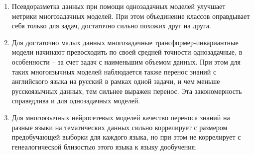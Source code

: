{}
\begin{enumerate}
  \item {Псевдоразметка данных при помощи однозадачных моделей улучшает метрики многозадачных моделей. При этом объединение классов оправдывает себя только для задач, достаточно сильно похожих друг на друга.}
  \item {Для достаточно малых данных многозадачные трансформер-инвариантные модели начинают превосходить по своей средней точности однозадачные, в особенности -- за счет задач с наименьшим объемом данных. При этом для таких многоязычных моделей наблюдается также перенос знаний с английского языка на русский в рамках одной задачи, и чем меньше русскоязычных данных, тем сильнее выражен перенос. Эта закономерность справедлива и для однозадачных моделей.}
  \item {Для многоязычных нейросетевых моделей качество переноса знаний на разные языки на тематических данных сильно коррелирует с размером предобучающей выборки для каждого языка, но при этом не коррелирует с генеалогической близостью этого языка к языку дообучения.}
\end{enumerate}


\iffalse
Направления исследований 1.2.2:
1. Разработка новых математических методов моделирования объектов и
явлений (физико-математические науки).
2. Разработка, обоснование и тестирование эффективных вычислительных
методов с применением современных компьютерных технологий.
3. Реализация эффективных численных методов и алгоритмов в виде
комплексов проблемно-ориентированных программ для проведения
вычислительного эксперимента.
4. Разработка новых математических методов и алгоритмов интерпретации
натурного эксперимента на основе его математической модели.
5. Разработка новых математических методов и алгоритмов валидации
математических моделей объектов на основе данных натурного эксперимента
или на основе анализа математических моделей.
6. Разработка систем компьютерного и имитационного моделирования,
алгоритмов и методов имитационного моделирования на основе анализа
математических моделей (технические науки).
7. Качественные или аналитические методы исследования математических
моделей (технические науки).
8. Комплексные исследования научных и технических проблем с
применением современной технологии математического моделирования и
вычислительного эксперимента.
9. Постановка и проведение численных экспериментов, статистический
анализ их результатов, в том числе с применением современных
компьютерных технологий (технические науки).
\fi


